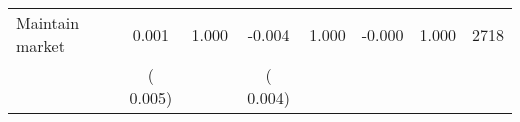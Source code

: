 \begin{tabular}{l*{7}{c}}
 Maintain market       &              0.001       &        1.000  &             -0.004       &        1.000  &             -0.000       &              1.000 &  2718 \\ 
                       &       (       0.005)             &                               &       (       0.004)                     &                               &                                               &                                &                      \\ 

\hline \end{tabular}